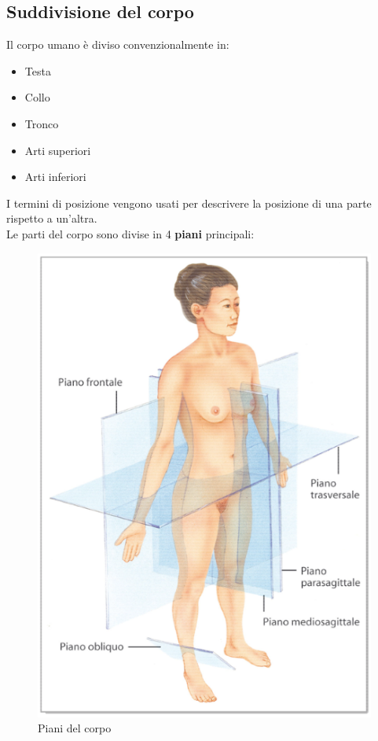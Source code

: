 \documentclass[a4paper]{article}
\begin{document}
\subsection{Suddivisione del corpo}
Il corpo umano è diviso convenzionalmente in:
\begin{itemize}
    \item Testa
    \item Collo
    \item Tronco
    \item Arti superiori
    \item Arti inferiori
\end{itemize}
I termini di posizione vengono usati per descrivere la posizione di una parte 
rispetto a un’altra. \\
Le parti del corpo sono divise in 4 \textbf{piani} principali:
\begin{figure}[H]
    \centering
    \includegraphics[scale=0.3]{figures/planes.png}
    \caption{Piani del corpo}
\end{figure}
\noindent
\end{document}
